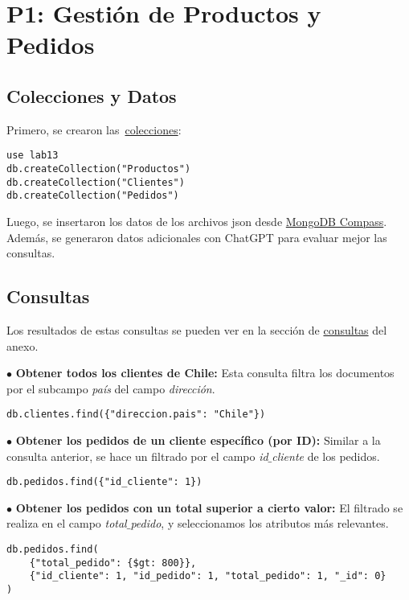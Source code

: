 \section{P1: Gestión de Productos y Pedidos}

\subsection{Colecciones y Datos}

Primero, se crearon las~\hyperref[fig:collections]{colecciones}:

\begin{verbatim}
use lab13
db.createCollection("Productos")
db.createCollection("Clientes")
db.createCollection("Pedidos")
\end{verbatim}

Luego, se insertaron los datos de los archivos json desde \hyperref[fig:clientes]{MongoDB Compass}. Además,
se generaron datos adicionales con ChatGPT para evaluar mejor las consultas.

\subsection{Consultas}

Los resultados de estas consultas se pueden ver en la sección de \hyperref[consultas]{consultas} del anexo.

$\bullet$ \textbf{Obtener todos los clientes de Chile:} Esta consulta filtra los documentos por el subcampo \textit{país}
del campo \textit{dirección}.
\begin{verbatim}
db.clientes.find({"direccion.pais": "Chile"})
\end{verbatim}

$\bullet$ \textbf{Obtener los pedidos de un cliente específico (por ID):} Similar a la consulta anterior, se hace
un filtrado por el campo \textit{id$\_$cliente} de los pedidos.
\begin{verbatim}
db.pedidos.find({"id_cliente": 1})
\end{verbatim}

$\bullet$ \textbf{Obtener los pedidos con un total superior a cierto valor:} El filtrado se realiza en el campo
\textit{total$\_$pedido}, y seleccionamos los atributos más relevantes.
\begin{verbatim}
db.pedidos.find(
    {"total_pedido": {$gt: 800}},
    {"id_cliente": 1, "id_pedido": 1, "total_pedido": 1, "_id": 0}
)
\end{verbatim}

